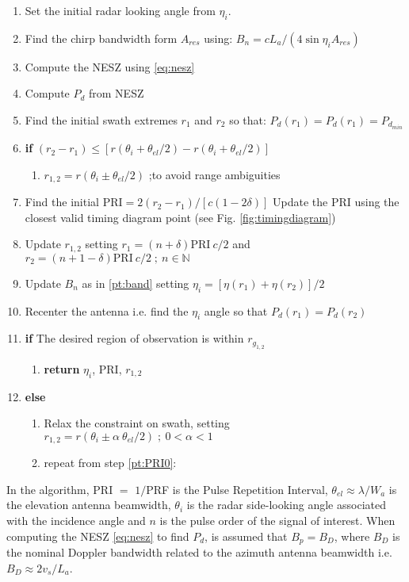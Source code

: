 \documentclass[conference,a4paper]{IEEEtran}
\begin{document}
    \begin{enumerate}
        \item Set the initial radar looking angle from $\eta_i$.
        \item \label{pt:band}Find the chirp bandwidth form $A_{res}$ using: $B_n = c L_a / (4 \sin{\eta_i} A_{res} )$
        \item Compute the NESZ using \eqref{eq:nesz}
        \item Compute $P_d$ from NESZ
        \item \label{pt:swath1}Find the initial swath extremes $r_{1}$ and $r_{2}$ so that: $P_d(r_1) = P_d(r_1) = P_{d_{min}}$
        \item \label{pt:swath2} \textbf{if} {$(r_2 - r_1) \leq \left[r(\theta_i + \theta_{el}/2) - r(\theta_i + \theta_{el}/2) \right]$}
        \begin{enumerate}
            \item $r_{1,2} = r(\theta_i \pm \theta_{el}/2)$ ;to avoid range ambiguities
        \end{enumerate}
        \item \label{pt:PRI0}Find the initial $\text{PRI} = 2(r_2 - r_1) / \left[c (1-2\delta)\right]$
        \label{pt:timingconstraint} Update the PRI using the closest valid timing diagram point (see Fig. \ref{fig:timingdiagram})
        \item Update $r_{1,2}$ setting $r_{1} = (n + \delta)\text{PRI}\ c / 2 $  and\\ $r_2 = (n + 1 - \delta)\text{PRI}\ c / 2\; ;\ n\in \mathbb{N}$
        \item Update $ B_n $ as in \ref{pt:band} setting $\eta_i = [\eta(r_1) + \eta(r_2)] / 2$
        \item Recenter the antenna i.e. find the $\eta_i$ angle so that $P_d(r_1) = P_d(r_2)$
        \item \textbf{if} {The desired region of observation is within $r_{g_{1,2}}$}
        \begin{enumerate}
            \item \textbf{return} $\eta_i$, PRI, $r_{1,2}$
        \end{enumerate}
        \item \textbf{else}
        \begin{enumerate}
            \item \label{pt:relaxed}Relax the constraint on swath, setting \\$r_{1,2} = r(\theta_i \pm \alpha\ \theta_{el}/2)\; ;\ 0< \alpha < 1 $
            \item repeat from step \ref{pt:PRI0}: %
        \end{enumerate}
    \end{enumerate}
    In the algorithm, PRI $=$ $1/$PRF is the Pulse Repetition Interval, $\theta_{el} \approx \lambda/W_a$ is the elevation antenna beamwidth, $\theta_i$ is the radar side-looking angle associated with the incidence angle and $n$ is the pulse order of the signal of interest.
    When computing the NESZ \eqref{eq:nesz} to find $P_d$, is assumed that $B_p = B_D$, where $B_D$ is the nominal Doppler bandwidth related to the azimuth antenna beamwidth i.e. $B_D \approx 2 v_s / L_a$.
\end{document}
